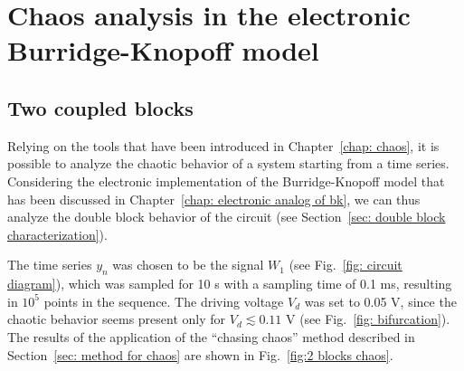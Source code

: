 \chapter{Chaos analysis in the electronic Burridge-Knopoff model}\label{chap: chaos analysis}


\section{Two coupled blocks}\label{sec: 2 blocks chaos}

Relying on the tools that have been introduced in Chapter~\ref{chap: chaos},
it is possible to analyze the chaotic behavior of a system starting from a time series.
Considering the electronic implementation of the Burridge-Knopoff model that has been discussed
in Chapter~\ref{chap: electronic analog of bk}, we can thus analyze the double block behavior
of the circuit (see Section~\ref{sec: double block characterization}).

The time series $y_n$ was chosen to be the signal $W_1$ (see Fig.~\ref{fig: circuit diagram}),
which was sampled for 10 s with a sampling time of 0.1 ms, resulting in $10^5$ points in the sequence.
The driving voltage $V_d$ was set to 0.05 V, since the chaotic behavior seems present only for
$V_d \lesssim 0.11$ V (see Fig.~\ref{fig: bifurcation}). The results of the application of the
``chasing chaos'' method described in Section~\ref{sec: method for chaos} are shown in Fig.~\ref{fig:2 blocks chaos}.

